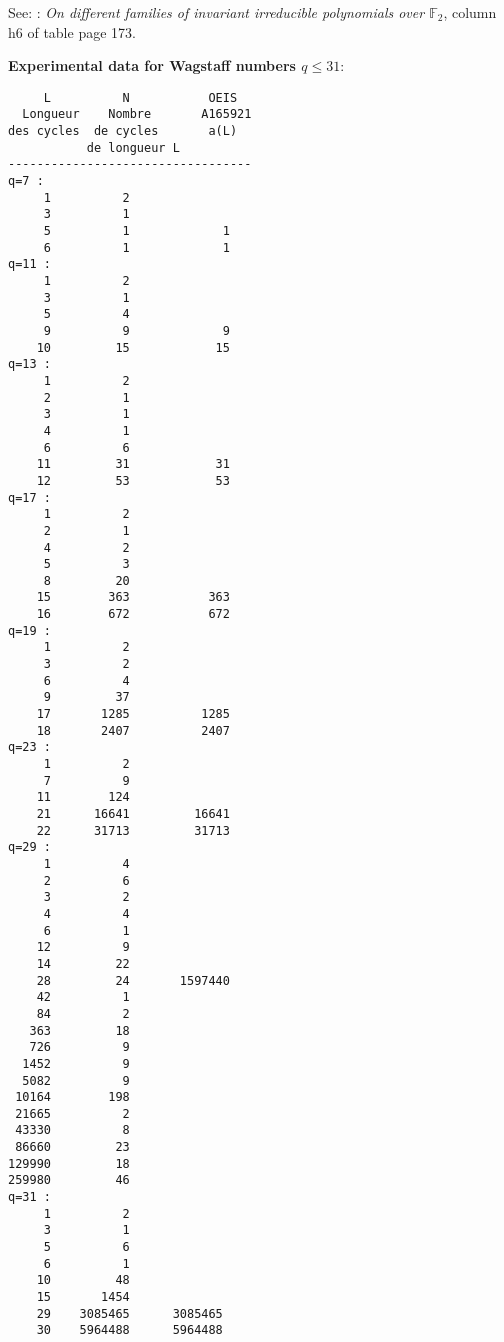 \documentclass[latin1]{quadrature}
\newif\ifenfrancais
\begin{document}
\begin{article}
\begin{article}
\vspace{.05in}
\ifenfrancais
Voir : \cite{Michon-Ravache}: \emph{On different families of invariant irreducible polynomials over $\mathbb{F}_2$}, colonne h6 du tableau en page 173.
\else
See: \cite{Michon-Ravache}: \emph{On different families of invariant irreducible polynomials over $\mathbb{F}_2$}, column h6 of table page 173.
\fi

\vspace{.1in}

\ifenfrancais
\textbf{Donn\'ees exp\'erimentales pour Wagstaff $q \leq 31$}:
\else
\textbf{Experimental data for Wagstaff numbers $q \leq 31$}:
\fi
\vspace{-.15in}
\small
\begin{verbatim}
     L          N           OEIS
  Longueur    Nombre       A165921
des cycles  de cycles       a(L)
           de longueur L
----------------------------------
q=7 :
     1          2
     3          1
     5          1             1
     6          1             1
q=11 :
     1          2
     3          1
     5          4
     9          9             9
    10         15            15
q=13 :
     1          2
     2          1
     3          1
     4          1
     6          6
    11         31            31
    12         53            53
q=17 :
     1          2
     2          1
     4          2
     5          3
     8         20
    15        363           363
    16        672           672
q=19 :
     1          2
     3          2
     6          4
     9         37
    17       1285          1285
    18       2407          2407
q=23 :
     1          2
     7          9
    11        124
    21      16641         16641
    22      31713         31713
q=29 :
     1          4
     2          6
     3          2
     4          4
     6          1
    12          9
    14         22
    28         24       1597440
    42          1
    84          2
   363         18
   726          9
  1452          9
  5082          9
 10164        198
 21665          2
 43330          8
 86660         23
129990         18
259980         46
q=31 :
     1          2
     3          1
     5          6
     6          1
    10         48
    15       1454
    29    3085465      3085465
    30    5964488      5964488
\end{verbatim}
\normalsize




\end{article}
\end{article}
\end{document}
